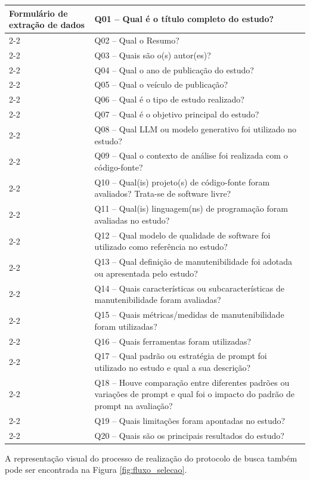 \begin{longtable}{|p{3.5cm}|p{11cm}|}
Formulário de extração de dados & Q01 -- Qual é o título completo do estudo? \\ \cline{2-2}
 & Q02 -- Qual o Resumo? \\ \cline{2-2}
 & Q03 -- Quais são o(s) autor(es)? \\ \cline{2-2}
 & Q04 -- Qual o ano de publicação do estudo? \\ \cline{2-2}
 & Q05 -- Qual o veículo de publicação? \\ \cline{2-2}
 & Q06 -- Qual é o tipo de estudo realizado? \\ \cline{2-2}
 & Q07 -- Qual é o objetivo principal do estudo? \\ \cline{2-2}
 & Q08 -- Qual LLM ou modelo generativo foi utilizado no estudo? \\ \cline{2-2}
 & Q09 -- Qual o contexto de análise foi realizada com o código-fonte? \\ \cline{2-2}
 & Q10 -- Qual(is) projeto(s) de código-fonte foram avaliados? Trata-se de software livre? \\ \cline{2-2}
 & Q11 -- Qual(is) linguagem(ns) de programação foram avaliadas no estudo? \\ \cline{2-2}
 & Q12 -- Qual modelo de qualidade de software foi utilizado como referência no estudo? \\ \cline{2-2}
 & Q13 -- Qual definição de manutenibilidade foi adotada ou apresentada pelo estudo? \\ \cline{2-2}
 & Q14 -- Quais características ou subcaracterísticas de manutenibilidade foram avaliadas? \\ \cline{2-2}
 & Q15 -- Quais métricas/medidas de manutenibilidade foram utilizadas? \\ \cline{2-2}
 & Q16 -- Quais ferramentas foram utilizadas? \\ \cline{2-2}
 & Q17 -- Qual padrão ou estratégia de prompt foi utilizado no estudo e qual a sua descrição? \\ \cline{2-2}
 & Q18 -- Houve comparação entre diferentes padrões ou variações de prompt e qual foi o impacto do padrão de prompt na avaliação? \\ \cline{2-2}
 & Q19 -- Quais limitações foram apontadas no estudo? \\ \cline{2-2}
 & Q20 -- Quais são os principais resultados do estudo? \\ \hline
\end{longtable}

A representação visual do processo de realização do protocolo de busca também pode ser encontrada na Figura \ref{fig:fluxo_selecao}.

